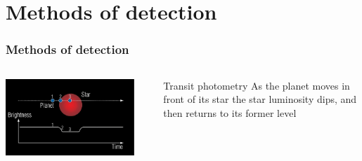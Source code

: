 \documentclass[aspectratio=169]{beamer}
\begin{document}
\section{Methods of detection}
\begin{frame}
\frametitle{Methods of detection}
\begin{columns}
\includegraphics[width=0.90\textwidth]{img/20130108_Planetary_transit_f537.jpg}
\begin{block}{Transit photometry}
As the planet moves in front of its star the star luminosity dips, and then returns to its former level
\end{block}
\end{columns}


\end{frame}
\end{document}
